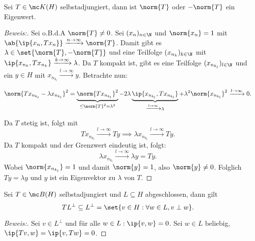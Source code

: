 \begin{theorem}
	\label{operatornorm_ev}
	Sei $T \in \mc K(H)$ selbstadjungiert, dann ist $\norm{T}$ oder $-\norm{T}$ ein Eigenwert.
	
	\begin{proof}[Beweis:]
		
		Sei o.B.d.A $\norm{T} \not= 0$. Sei $(x_n)_{n \in \N}$ und $\norm{x_n} = 1$ mit $\ab{\ip{x_n, Tx_n}} \xrightarrow{n \to \infty} \norm{T}$. Damit gibt es $\lambda \in \set{\norm{T}, -\norm{T}}$ und eine Teilfolge $(x_{n_k})_{k \in \N}$ mit $\ip{x_{n_k}, Tx_{n_k}} \xrightarrow{k \to \infty} \lambda$. Da $T$ kompakt ist, gibt es eine Teilfolge $(x_{n_{k_l}})_{l \in \N}$ und ein $y \in H$ mit $x_{n_{k_l}} \xrightarrow{l \to \infty} y$. Betrachte nun:
		
		\[ \norm{Tx_{n_{k_l}} - \lambda x_{n_{k_l}}}^2 = \underbrace{\norm{T x_{n_{k_l}}}^2}_{\leq \norm{T}^2 = \lambda^2} - 2 \lambda \underbrace{\ip{x_{n_{k_l}}, T x_{n_{k_l}}}}_{\xrightarrow{l \to \infty} \lambda} + \lambda^2 \norm{x_{n_{k_l}}}^2 \xrightarrow{l \to \infty} 0. \]
		
		
		Da $T$ stetig ist, folgt mit \[T x_{n_{k_l}} \xrightarrow{l \to \infty} Ty \implies \lambda x_{n_{k_l}} \xrightarrow{l \to \infty} Ty.\] Da $T$ kompakt und der Grenzwert eindeutig ist, folgt: \[\lambda x_{n_{k_l}} \xrightarrow{l \to \infty} \lambda y = Ty.\] Wobei $\norm{x_{n_{k_l}}} = 1$ und damit $\norm{y} = 1$, also $\norm{y} \not= 0$. Folglich $Ty = \lambda y$ und $y$ ist ein Eigenvektor zu $\lambda$ von $T$.
		
	\end{proof}
	
\end{theorem}


\begin{theorem}
	
	Sei $T \in \mc B(H)$ selbstadjungiert und $L \subseteq H$ abgeschlossen, dann gilt \[TL^{\perp} \subseteq L^{\perp} = \set{v \in H: \forall w \in L, v \perp w}.\]
	
	\begin{proof}[Beweis:]
		
		Sei $v \in L^{\perp}$ und für alle $w \in L: \ip{v, w} = 0$. Sei $w \in L$ beliebig, $\ip{Tv, w} = \ip{v, Tw} = 0$.
		
	\end{proof}
	
\end{theorem}